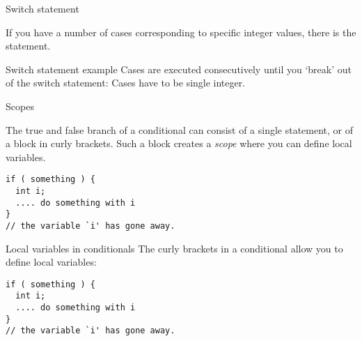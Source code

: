  {Switch statement}

If you have a number of cases corresponding to specific integer
values, there is the  statement.

\begin{block}{Switch statement example}
  \label{sl:switch}
  Cases are executed consecutively until you `break' out of the switch
  statement:
  Cases have to be single integer.
\end{block}

 {Scopes}

The true and false branch of a conditional can consist of a single
statement, or of a block in curly brackets. Such a block creates a
%
\emph{scope}
%
where you can define local variables.

\begin{verbatim}
if ( something ) {
  int i; 
  .... do something with i
}
// the variable `i' has gone away.
\end{verbatim}

\begin{slide}{Local variables in conditionals}
  \label{sl:if-scope}
  The curly brackets in a conditional allow you to define local variables:
\begin{verbatim}
if ( something ) {
  int i; 
  .... do something with i
}
// the variable `i' has gone away.
\end{verbatim}
\end{slide}

